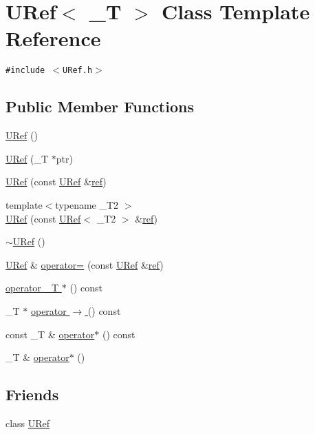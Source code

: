 \hypertarget{class_u_ref}{
\section{URef$<$ \_\-T $>$ Class Template Reference}
\label{class_u_ref}
}
{\tt \#include $<$URef.h$>$}

\subsection*{Public Member Functions}
\begin{CompactItemize}
\item 
\hyperlink{class_u_ref_6286bbc19c27c466e899dcc18b77f2bb}{URef} ()
\item 
\hyperlink{class_u_ref_c777ca0d066ea150f871d66bdb58c8a3}{URef} (\_\-T $\ast$ptr)
\item 
\hyperlink{class_u_ref_b08d8841363db937ecff64b0c4a3708a}{URef} (const \hyperlink{class_u_ref}{URef} \&\hyperlink{glext__bak_8h_083de4c8e32ad3d9059245f26be721de}{ref})
\item 
{\footnotesize template$<$typename \_\-T2 $>$ }\\\hyperlink{class_u_ref_da86fb36f9910e52dfb81ce3c19d31c1}{URef} (const \hyperlink{class_u_ref}{URef}$<$ \_\-T2 $>$ \&\hyperlink{glext__bak_8h_083de4c8e32ad3d9059245f26be721de}{ref})
\item 
\hyperlink{class_u_ref_b36e5b2d9fa86ccf28bc5e939ee7dd90}{$\sim$URef} ()
\item 
\hyperlink{class_u_ref}{URef} \& \hyperlink{class_u_ref_df1f62d1ff5aba640b9b341d6f7686e1}{operator=} (const \hyperlink{class_u_ref}{URef} \&\hyperlink{glext__bak_8h_083de4c8e32ad3d9059245f26be721de}{ref})
\item 
\hyperlink{class_u_ref_31f31cd4531e3c101eb3abe46d3c436a}{operator \_\-T $\ast$} () const 
\item 
\_\-T $\ast$ \hyperlink{class_u_ref_21d86cb3b553341b033f498d47091e15}{operator $\rightarrow$ } () const 
\item 
const \_\-T \& \hyperlink{class_u_ref_e6e1f7ea646d5988ea2d12639518e042}{operator$\ast$} () const 
\item 
\_\-T \& \hyperlink{class_u_ref_7a7e59bd3b36450974ba87512d0af445}{operator$\ast$} ()
\end{CompactItemize}
\subsection*{Friends}
\begin{CompactItemize}
\item 
class \hyperlink{class_u_ref_b61ec4575c614503f78987c752b49372}{URef}
\end{CompactItemize}


